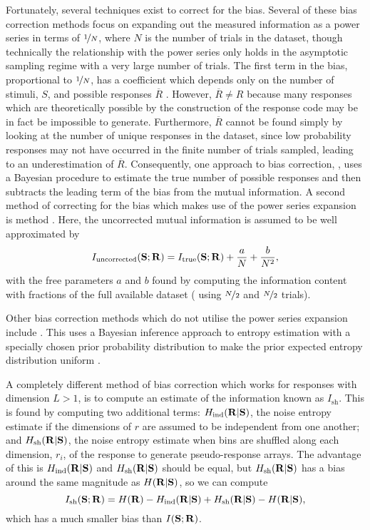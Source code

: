 Fortunately, several techniques exist to correct for the bias.
Several of these bias correction methods focus on expanding out the measured information as a power series \citep{Miller1955,Treves1995} in terms of $\nicefrac{1}{N}$, where $N$ is the number of trials in the dataset, though technically the relationship with the power series only holds in the asymptotic sampling regime with a very large number of trials.
The first term in the bias, proportional to $\nicefrac{1}{N}$, has a coefficient which depends only on the number of stimuli, $S$, and possible responses $\overline{R}$ .
However, $\overline{R} \neq R$ because many responses which are theoretically possible by the construction of the response code may be in fact be impossible to generate.
Furthermore, $\overline{R}$ cannot be found simply by looking at the number of unique responses in the dataset, since low probability responses may not have occurred in the finite number of trials sampled, leading to an underestimation of $\overline{R}$.
Consequently, one approach to bias correction,  \citep{Panzeri1996}, uses a Bayesian procedure to estimate the true number of possible responses and then subtracts the leading term of the bias from the mutual information.
A second method of correcting for the bias which makes use of the power series expansion is  method \citep{Strong1998}.
Here, the uncorrected mutual information is assumed to be well approximated by
\begin{equation}
I_{\text{uncorrected}}(\mathbf{S};\mathbf{R}) = I_{\text{true}}(\mathbf{S};\mathbf{R}) + \frac{a}{N} + \frac{b}{N^2}
,\end{equation}
with the free parameters $a$ and $b$ found by computing the information content with fractions of the full available dataset (\ie{} using $\nicefrac{N}{2}$ and $\nicefrac{N}{2}$ trials).

Other bias correction methods which do not utilise the power series expansion include .
This uses a Bayesian inference approach to entropy estimation with a specially chosen prior probability distribution to make the prior expected entropy distribution uniform \citep{Nemenman2004}.

A completely different method of bias correction which works for responses with dimension $L > 1$, is to compute an estimate of the information known as $I_{\text{sh}}$.
This is found \citep{Montemurro2007} by computing two additional terms: $H_\text{ind}( \mathbf{R} | \mathbf{S} )$, the noise entropy estimate if the dimensions of $r$ are assumed to be independent from one another; and $H_\text{sh}( \mathbf{R} | \mathbf{S} )$, the noise entropy estimate when bins are shuffled along each dimension, $r_i$, of the response to generate pseudo-response arrays.
The advantage of this is $H_\text{ind}( \mathbf{R} | \mathbf{S} )$ and $H_\text{sh}( \mathbf{R} | \mathbf{S} )$ should be equal, but $H_\text{sh}( \mathbf{R} | \mathbf{S} )$ has a bias around the same magnitude as $H( \mathbf{R} | \mathbf{S} )$, so we can compute
\begin{equation}
I_{\text{sh}}(\mathbf{S};\mathbf{R}) = H( \mathbf{R} ) - H_\text{ind}( \mathbf{R} | \mathbf{S} ) + H_\text{sh}( \mathbf{R} | \mathbf{S} ) - H( \mathbf{R} | \mathbf{S} )
,\end{equation}
which has a much smaller bias than $I(\mathbf{S};\mathbf{R})$.


